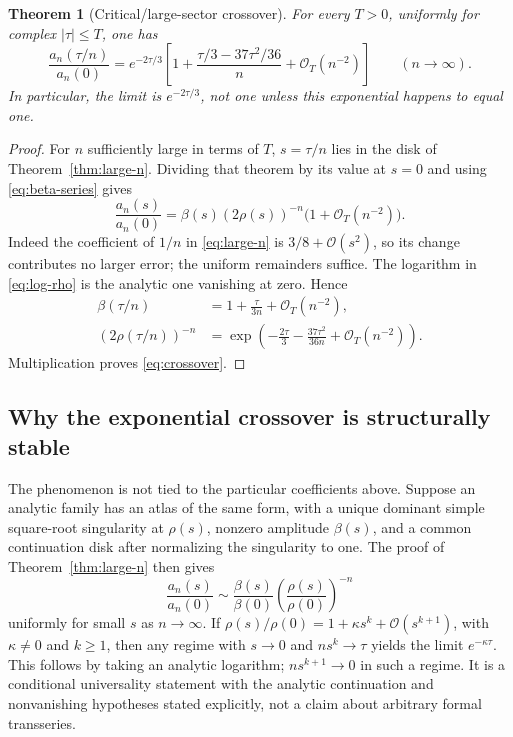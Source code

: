 \documentclass[11pt,a4paper]{article}
\newtheorem{theorem}{Theorem}[section]
\theoremstyle{definition}
\theoremstyle{remark}
\newcommand{\OO}{\mathcal O}
\begin{document}
\begin{theorem}[Critical/large-sector crossover]\label{thm:crossover}
For every $T>0$, uniformly for complex $|\tau|\le T$, one has
\begin{equation}\label{eq:crossover}
 \frac{a_n(\tau/n)}{a_n(0)}
 =e^{-2\tau/3}
 \left[1+\frac{\tau/3-37\tau^2/36}{n}
                       +\OO_T(n^{-2})\right]
 \qquad(n\to\infty).
\end{equation}
In particular, the limit is $e^{-2\tau/3}$, not one unless this
exponential happens to equal one.
\end{theorem}
\begin{proof}
For $n$ sufficiently large in terms of $T$, $s=\tau/n$ lies in the disk
of Theorem~\ref{thm:large-n}. Dividing that theorem by its value at $s=0$
and using \eqref{eq:beta-series} gives
\[
 \frac{a_n(s)}{a_n(0)}
 =\beta(s)(2\rho(s))^{-n}\bigl(1+\OO_T(n^{-2})\bigr).
\]
Indeed the coefficient of $1/n$ in \eqref{eq:large-n} is $3/8+\OO(s^2)$,
so its change contributes no larger error; the uniform remainders suffice.
The logarithm in \eqref{eq:log-rho} is the analytic one vanishing at zero.
Hence
\begin{align*}
 \beta(\tau/n)&=1+\frac{\tau}{3n}+\OO_T(n^{-2}),\\
 (2\rho(\tau/n))^{-n}
 &=\exp\left(-\frac{2\tau}{3}-\frac{37\tau^2}{36n}
                          +\OO_T(n^{-2})\right).
\end{align*}
Multiplication proves \eqref{eq:crossover}.
\end{proof}

\subsection{Why the exponential crossover is structurally stable}
The phenomenon is not tied to the particular coefficients above. Suppose
an analytic family has an atlas of the same form, with a unique dominant
simple square-root singularity at $\rho(s)$, nonzero amplitude $\beta(s)$,
and a common continuation disk after normalizing the singularity to one.
The proof of Theorem~\ref{thm:large-n} then gives
\[
 \frac{a_n(s)}{a_n(0)}\sim
 \frac{\beta(s)}{\beta(0)}
       \left(\frac{\rho(s)}{\rho(0)}\right)^{-n}
\]
uniformly for small $s$ as $n\to\infty$.
If
$\rho(s)/\rho(0)=1+\kappa s^k+\OO(s^{k+1})$, with
$\kappa\ne0$ and $k\ge1$, then any regime with $s\to0$ and
$ns^k\to\tau$ yields the limit $e^{-\kappa\tau}$.
This follows by taking an analytic logarithm; $ns^{k+1}\to0$ in such a
regime. It is a conditional universality statement with the analytic
continuation and nonvanishing hypotheses stated explicitly, not a claim
about arbitrary formal transseries.
\end{document}
